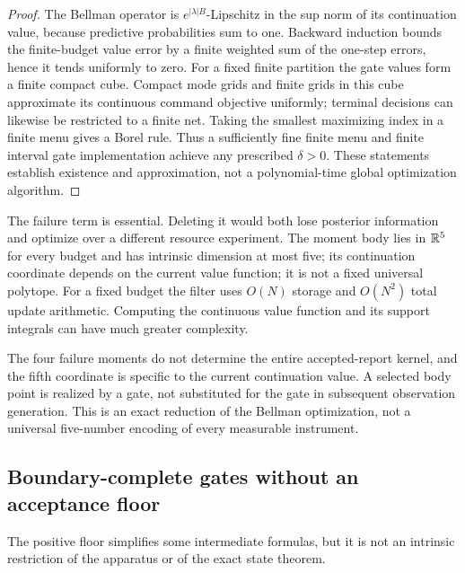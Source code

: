 \begin{proof}
The Bellman operator is $e^{|\lambda|B}$-Lipschitz in the sup norm of its
continuation value, because predictive probabilities sum to one. Backward
induction bounds the finite-budget value error by a finite weighted sum of
the one-step errors, hence it tends uniformly to zero. For a fixed finite
partition the gate values form a finite compact cube. Compact mode grids
and finite grids in this cube approximate its continuous command objective
uniformly; terminal decisions can likewise be restricted to a finite net.
Taking the smallest maximizing index in a finite menu gives a Borel rule.
Thus a sufficiently fine finite menu and finite interval gate implementation
achieve any prescribed $\delta>0$. These statements establish existence and
approximation, not a polynomial-time global optimization algorithm.
\end{proof}

The failure term is essential. Deleting it would both lose posterior
information and optimize over a different resource experiment. The moment
body lies in $\mathbb R^5$ for every budget and has intrinsic dimension at most five; its continuation coordinate
depends on the current value function; it is not a fixed universal polytope.
For a fixed budget the filter uses $O(N)$ storage and $O(N^2)$ total update
arithmetic. Computing the continuous value function and its support
integrals can have much greater complexity.

The four failure moments do not determine the entire accepted-report
kernel, and the fifth coordinate is specific to the current continuation
value. A selected body point is realized by a gate, not substituted for the
gate in subsequent observation generation. This is an exact reduction of
the Bellman optimization, not a universal five-number encoding of every
measurable instrument.

\subsection{Boundary-complete gates without an acceptance floor}
The positive floor simplifies some intermediate formulas, but it is not an
intrinsic restriction of the apparatus or of the exact state theorem.

